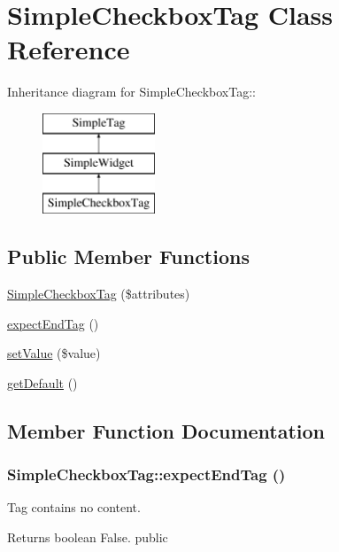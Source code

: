 \hypertarget{class_simple_checkbox_tag}{
\section{SimpleCheckboxTag Class Reference}
\label{class_simple_checkbox_tag}
}
Inheritance diagram for SimpleCheckboxTag::\begin{figure}[H]
\begin{center}
\leavevmode
\includegraphics[height=3cm]{class_simple_checkbox_tag}
\end{center}
\end{figure}
\subsection*{Public Member Functions}
\begin{DoxyCompactItemize}
\item 
\hyperlink{class_simple_checkbox_tag_a2f8a9636c13ffb744c0e8a8b248fd4cc}{SimpleCheckboxTag} (\$attributes)
\item 
\hyperlink{class_simple_checkbox_tag_aabd9d2caa814893d18b13945985a100a}{expectEndTag} ()
\item 
\hyperlink{class_simple_checkbox_tag_a9ff9d413cacf20c94173be8c16022fa0}{setValue} (\$value)
\item 
\hyperlink{class_simple_checkbox_tag_a7d35adf28b5e7e0b891464e47ac1a6bc}{getDefault} ()
\end{DoxyCompactItemize}


\subsection{Member Function Documentation}
\hypertarget{class_simple_checkbox_tag_aabd9d2caa814893d18b13945985a100a}{
\subsubsection[{expectEndTag}]{\setlength{\rightskip}{0pt plus 5cm}SimpleCheckboxTag::expectEndTag ()}}
\label{class_simple_checkbox_tag_aabd9d2caa814893d18b13945985a100a}
Tag contains no content. \begin{DoxyReturn}{Returns}
boolean False.  public 
\end{DoxyReturn}



